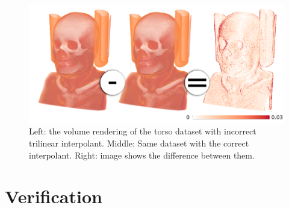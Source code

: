 \begin{figure}[b]
\centering
\includegraphics[width=1\linewidth]{chapter5/figures/torso-image.png}
\caption{\label{fig:error-quantification-examples}  Left: 
  the volume rendering of the torso dataset with incorrect trilinear
  interpolant. Middle: Same dataset with the correct 
  interpolant. Right:  image shows
  the difference between them.}
\end{figure}

\section{Verification}
\label{sec:verification}

